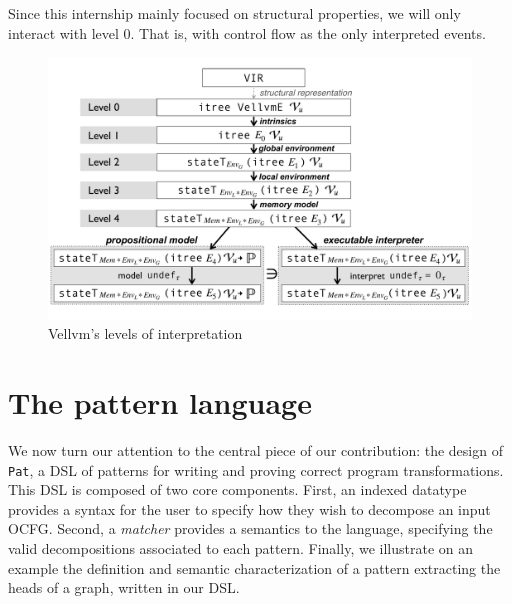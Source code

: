 \documentclass[11pt]{article}
\newcommand{\yz}[1]{\textcolor{ForestGreen}{#1}}
\newcommand{\yzt}[1]{\textcolor{ForestGreen!50}{#1}}
\newcommand{\ocfg}{OCFG\xspace}
\newcommand{\pat}{\texttt{Pat}\xspace}
\begin{document}
Since this internship mainly focused on structural properties, we will only interact with level 0. That is, with control flow as the only interpreted events.

\begin{figure}
  \includegraphics[width=\textwidth]{images/interp-figure.pdf}
  \caption{Vellvm's levels of interpretation}
  \label{fig:interp}
\end{figure}

\section{The pattern language}
\label{sec:lang}




\yzt{We now turn our attention to the central piece of our contribution: the design of \pat{}, a DSL of patterns for writing and proving correct program transformations. This DSL is composed of two core components. First, an indexed datatype provides a syntax for the user to specify how they wish to decompose an input \ocfg. Second, a \emph{matcher} provides a semantics to the language, specifying the valid decompositions associated to each pattern. Finally, we illustrate on an example the definition and semantic characterization of a pattern extracting the heads of a graph, written in our DSL.}
\end{document}

